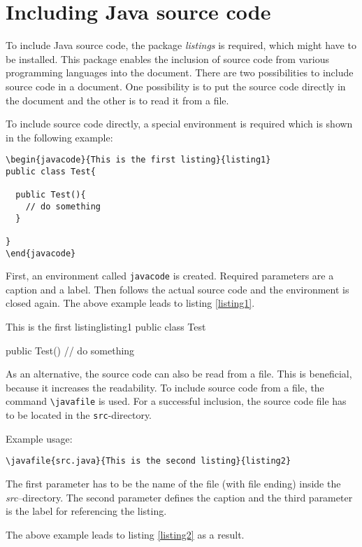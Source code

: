%
\section{Including Java source code}
%
To include Java source code, the package \emph{listings} is required, which might have to be installed.
This package enables the inclusion of source code from various programming languages into the document.
There are two possibilities to include source code in a document. 
One possibility is to put the source code directly in the document and the other is to read it from a file.

To include source code directly, a special environment is required which is shown in the following example:

\begin{verbatim}
\begin{javacode}{This is the first listing}{listing1}
public class Test{

  public Test(){
    // do something
  }

}
\end{javacode}
\end{verbatim}
%
First, an environment called \texttt{javacode} is created.
Required parameters are a caption and a label.
Then follows the actual source code and the environment is closed again.
The above example leads to listing \ref{listing1}.

\begin{javacode}{This is the first listing}{listing1}
public class Test {

  public Test(){
    // do something
  }

}
\end{javacode}

As an alternative, the source code can also be read from a file.
This is beneficial, because it increases the readability.
To include source code from a file, the command \texttt{\textbackslash javafile} is used. 
For a successful inclusion, the source code file has to be located in the \texttt{src}-directory. 

Example usage:
\begin{verbatim}
\javafile{src.java}{This is the second listing}{listing2}
\end{verbatim}

The first parameter has to be the name of the file (with file ending) inside the \emph{src}--directory.
The second parameter defines the caption and the third parameter is the label for referencing the listing.

The above example leads to listing \ref{listing2} as a result.

